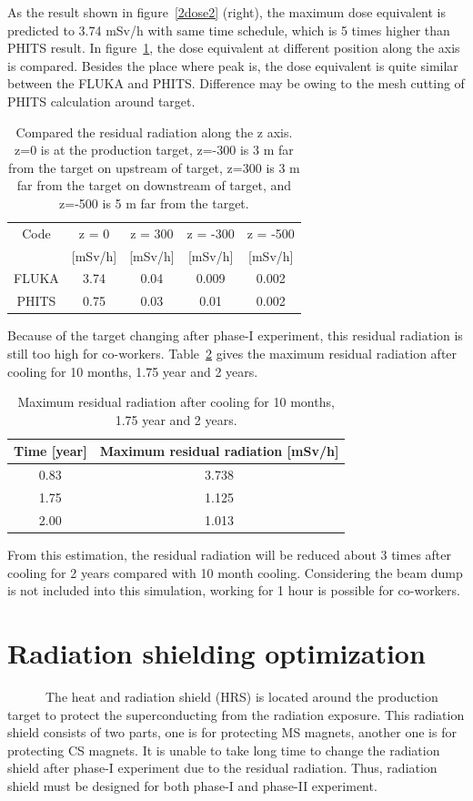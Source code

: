 As the result shown in figure~\ref{2dose2} (right), the maximum dose equivalent is predicted to 3.74 mSv/h with same time schedule, which is 5 times higher than PHITS result.
In figure~\ref{dosepo}, the dose equivalent at different position along the axis is compared.
Besides the place where peak is, the dose equivalent is quite similar between the FLUKA and PHITS.
Difference may be owing to the mesh cutting of PHITS calculation around target.
 \begin{table}[H]
 \centering
 \begin{tabular}{ccccc} \hline \hline
  Code & z = 0 & z = 300 & z = -300 & z = -500 \\
   & [mSv/h] & [mSv/h] & [mSv/h] & [mSv/h] \\ \hline
  FLUKA & 3.74 & 0.04 & 0.009 & 0.002 \\
  PHITS & 0.75 & 0.03 & 0.01 & 0.002 \\ \hline \hline
 \end{tabular}
 \caption{Compared the residual radiation along the z axis. z=0 is at the production target, z=-300 is 3 m far from the target on upstream of target, z=300 is 3 m far from the target on downstream of target, and z=-500 is 5 m far from the target.}
 \label{dosepo}
\end{table}
Because of the target changing after phase-I experiment, this residual radiation is still too high for co-workers.
Table~\ref{2time} gives the maximum residual radiation after cooling for 10 months, 1.75 year and 2 years.
\begin{table}[H]
 \centering
 \begin{tabular}{cc} \hline \hline
  Time [year] & Maximum residual radiation [mSv/h] \\ \hline
  0.83 & 3.738 \\
  1.75 & 1.125 \\
  2.00 & 1.013 \\ \hline \hline
 \end{tabular}
 \caption{Maximum residual radiation after cooling for 10 months, 1.75 year and 2 years.}
 \label{2time}
\end{table}
From this estimation, the residual radiation will be reduced about 3 times after cooling for 2 years compared with 10 month cooling.
Considering the beam dump is not included into this simulation, working for 1 hour is possible for co-workers.

 \section{Radiation shielding optimization}
~~~~~~The heat and radiation shield (HRS) is located around the production target to protect the superconducting from the radiation exposure.
This radiation shield consists of two parts, one is for protecting MS magnets, another one is for protecting CS magnets.
It is unable to take long time to change the radiation shield after phase-I experiment due to the residual radiation.
Thus, radiation shield must be designed for both phase-I and phase-II experiment.

